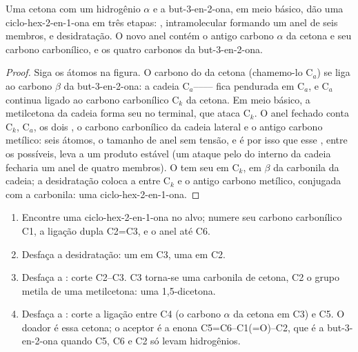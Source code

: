 \begin{proposition}\label{prop:b2:conjugate-additions:robinson}
Uma cetona com um hidrogênio $\alpha$ e a but-3-en-2-ona, em meio básico, dão uma ciclo-hex-2-en-1-ona
em três etapas: ,  intramolecular formando um anel de seis membros, e
desidratação. O novo anel contém o antigo carbono $\alpha$ da cetona e seu carbono carbonílico, e os
quatro carbonos da but-3-en-2-ona.
\end{proposition}

\begin{proof}
Siga os átomos na figura. O carbono do  da cetona (chamemo-lo C$_a$) se liga ao carbono $\beta$
da but-3-en-2-ona: a cadeia C$_a$-------- fica pendurada em C$_a$, e
C$_a$ continua ligado ao carbono carbonílico C$_k$ da cetona. Em meio básico, a metilcetona da cadeia
forma seu  no  terminal, que ataca C$_k$. O anel fechado conta C$_k$, C$_a$,
os dois , o carbono carbonílico da cadeia lateral e o antigo carbono metílico: seis átomos, o
tamanho de anel sem tensão, e é por isso que esse , entre os possíveis, leva a um produto estável
(um ataque pelo  do  interno da cadeia fecharia um anel de quatro membros). O  tem
seu  em C$_k$, em $\beta$ da carbonila da cadeia; a desidratação coloca a  entre C$_k$ e
o antigo carbono metílico, conjugada com a carbonila: uma ciclo-hex-2-en-1-ona.
\end{proof}

\begin{method}\label{met:b2:conjugate-additions:robinson-disconnection}
\begin{enumerate}
  \item Encontre uma ciclo-hex-2-en-1-ona no alvo; numere seu carbono carbonílico C1, a ligação dupla
        C2=C3, e o anel até C6.
  \item Desfaça a desidratação: um  em C3, uma  em C2.
  \item Desfaça a : corte C2--C3. C3 torna-se uma carbonila de cetona, C2 o grupo metila de
        uma metilcetona: uma 1,5-dicetona.
  \item Desfaça a : corte a ligação entre C4 (o carbono $\alpha$ da cetona em C3) e
        C5. O doador é essa cetona; o aceptor é a enona C5=C6--C1(=O)--C2, que é a
        but-3-en-2-ona quando C5, C6 e C2 só levam hidrogênios.
\end{enumerate}
\end{method}

